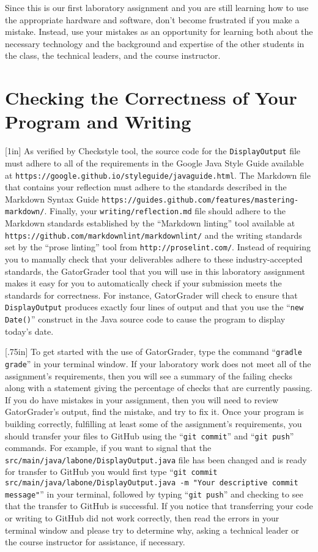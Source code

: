 \documentclass[11pt]{article}
\newcommand{\mainprogram}{\lstinline{DisplayOutput}}
\newcommand{\mainprogramsource}{\lstinline{src/main/java/labone/DisplayOutput.java}}
\newcommand{\reflection}{\lstinline{writing/reflection.md}}
\newcommand{\gatorgraderstart}{\command{gradle grade}}
\newcommand{\gitcommit}{\command{git commit}}
\newcommand{\gitpush}{\command{git push}}
\newcommand{\gitcommitmainprogram}{\command{git commit src/main/java/labone/DisplayOutput.java -m "Your
descriptive commit message"}}
\newcommand{\command}[1]{``\lstinline{#1}''}
\newcommand{\url}[1]{\lstinline{#1}}
\newcommand{\step}[1]{``{#1}''}
\newcommand{\caution}[1]{\null\hfill\LARGE{\faWarning{}}\newline\scriptsize{\em{#1}}}
\newcommand{\resource}[1]{\null\hfill\LARGE{\faLink{}}\newline\scriptsize{\em{#1}}}
\begin{document}
Since this is our first laboratory assignment and you are still learning how to
use the appropriate hardware and software, don't become frustrated if you make a
mistake. Instead, use your mistakes as an opportunity for learning both about
the necessary technology and the background and expertise of the other students
in the class, the technical leaders, and the course instructor.

\section*{Checking the Correctness of Your Program and Writing}

\marginnote{\resource{Study style guides}}[1in] As verified by Checkstyle
tool, the source code for the \mainprogram{} file must adhere to all of the
requirements in the Google Java Style Guide available at
\url{https://google.github.io/styleguide/javaguide.html}. The Markdown file
that contains your reflection must adhere to the standards described in the
Markdown Syntax Guide
\url{https://guides.github.com/features/mastering-markdown/}. Finally, your
\reflection{} file should adhere to the Markdown standards established by the
\step{Markdown linting} tool available at
\url{https://github.com/markdownlint/markdownlint/} and the writing standards
set by the \step{prose linting} tool from \url{http://proselint.com/}. Instead
of requiring you to manually check that your deliverables adhere to these
industry-accepted standards, the GatorGrader tool that you will use in this
laboratory assignment makes it easy for you to automatically check if your
submission meets the standards for correctness. For instance, GatorGrader will
check to ensure that \mainprogram{} produces exactly four lines of output and
that you use the \command{new Date()} construct in the Java source code to
cause the program to display today's date.

\marginnote{\caution{Write useful commits}}[.75in] To get started with the use
of GatorGrader, type the command \gatorgraderstart{} in your terminal window. If
your laboratory work does not meet all of the assignment's requirements, then
you will see a summary of the failing checks along with a statement giving the
percentage of checks that are currently passing. If you do have mistakes in your
assignment, then you will need to review GatorGrader's output, find the mistake,
and try to fix it. Once your program is building correctly, fulfilling at least
some of the assignment's requirements, you should transfer your files to GitHub
using the \gitcommit{} and \gitpush{} commands. For example, if you want to
signal that the \mainprogramsource{} file has been changed and is ready for
transfer to GitHub you would first type \gitcommitmainprogram{} in your
terminal, followed by typing \gitpush{} and checking to see that the transfer to
GitHub is successful. If you notice that transferring your code or writing to
GitHub did not work correctly, then read the errors in your terminal window and
please try to determine why, asking a technical leader or the course instructor
for assistance, if necessary.
\end{document}
